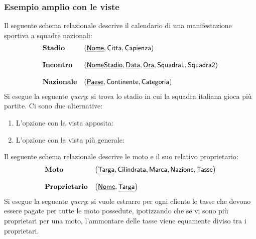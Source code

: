 \documentclass[a4paper]{article}
\begin{document}
	\subsubsection{Esempio amplio con le viste}
	
	Il seguente schema relazionale descrive il calendario di una manifestazione sportiva a squadre nazionali:
	\begin{equation*}
		\begin{array}{ll}
			\textbf{Stadio} 	& \left( \textsf{\underline{Nome}}, \textsf{Citta}, \textsf{Capienza} \right) \\
			\\
			\textbf{Incontro} 	& \left( \textsf{\underline{NomeStadio}}, \textsf{\underline{Data}}, \textsf{\underline{Ora}}, \textsf{Squadra1}, \textsf{Squadra2} \right) \\
			\\
			\textbf{Nazionale} 	& \left( \textsf{\underline{Paese}}, \textsf{Continente}, \textsf{Categoria} \right) \\
		\end{array}
	\end{equation*}
	Si esegue la seguente \emph{query}: si trova lo stadio in cui la squadra italiana gioca più partite. Ci sono due alternative:
	\begin{enumerate}
		\item L'opzione con la vista apposita:
		
		
		\item L'opzione con la vista più generale:
		
	\end{enumerate}\newpage
	
	\noindent
	Il seguente schema relazionale descrive le moto e il suo relativo proprietario:
	\begin{equation*}
		\begin{array}{ll}
			\textbf{Moto} 			& \left( \textsf{\underline{Targa}}, \textsf{Cilindrata}, \textsf{Marca}, \textsf{Nazione}, \textsf{Tasse} \right) \\
			\\
			\textbf{Proprietario}	& \left( \textsf{\underline{Nome}}, \textsf{\underline{Targa}}\right) \\
		\end{array}
	\end{equation*}
	Si esegue la seguente \emph{query}: si vuole estrarre per ogni cliente le tasse che devono essere pagate per tutte le moto possedute, ipotizzando che se vi sono più proprietari per una moto, l'ammontare delle tasse viene equamente diviso tra i proprietari.
	\newpage
\end{document}
